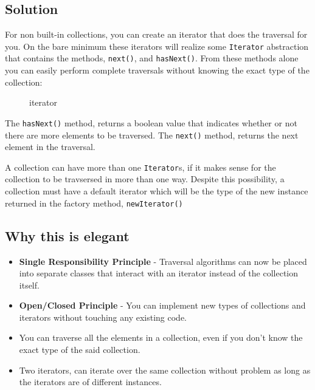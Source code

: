 \subsection{Solution}\label{behavioral-patterns.md__solution-5}

For non built-in collections, you can create an iterator that does the
traversal for you. On the bare minimum these iterators will realize some
\texttt{Iterator} abstraction that contains the methods,
\texttt{next()}, and \texttt{hasNext()}. From these methods alone you
can easily perform complete traversals without knowing the exact type of
the collection:

\begin{Shaded}
\begin{Highlighting}[]
\OperatorTok{=}
    \NormalTok{())}
\end{Highlighting}
\end{Shaded}

\begin{figure}
\centering
\pandocbounded{}
\caption{iterator}
\end{figure}

The \texttt{hasNext()} method, returns a boolean value that indicates
whether or not there are more elements to be traversed. The
\texttt{next()} method, returns the next element in the traversal.

A collection can have more than one \texttt{Iterator}s, if it makes
sense for the collection to be travsersed in more than one way. Despite
this possibility, a collection must have a default iterator which will
be the type of the new instance returned in the factory method,
\texttt{newIterator()}

\subsection{Why this is
elegant}\label{behavioral-patterns.md__why-this-is-elegant-5}

\begin{itemize}
\item
  \textbf{Single Responsibility Principle} - Traversal algorithms can
  now be placed into separate classes that interact with an iterator
  instead of the collection itself.
\item
  \textbf{Open/Closed Principle} - You can implement new types of
  collections and iterators without touching any existing code.
\item
  You can traverse all the elements in a collection, even if you don't
  know the exact type of the said collection.
\item
  Two iterators, can iterate over the same collection without problem as
  long as the iterators are of different instances.
\end{itemize}

